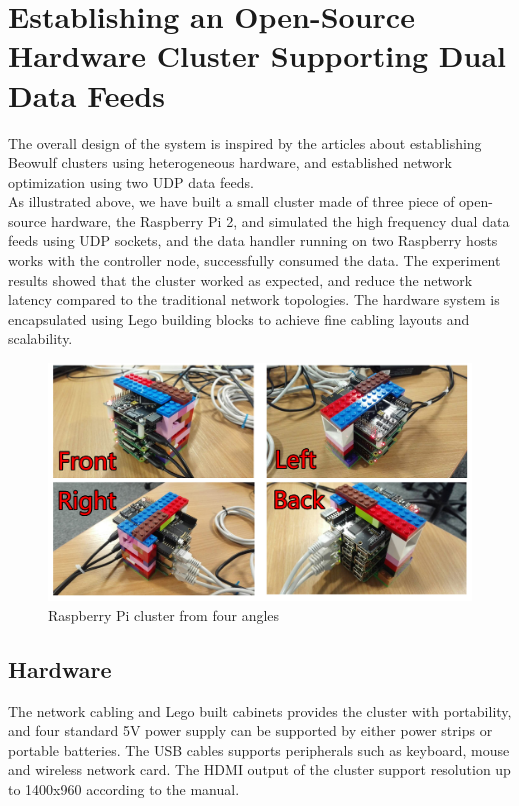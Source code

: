 \documentclass[11pt,openright,a4paper]{report}
\begin{document}
\section{Establishing an Open-Source Hardware Cluster Supporting Dual Data Feeds}
The overall design of the system is inspired by the articles about establishing Beowulf clusters using heterogeneous hardware\cite{kiepert2013creating}, and established network optimization using two UDP data feeds\cite{chordia2013high}. \\
As illustrated above, we have built a small cluster made of three piece of open-source hardware, the Raspberry Pi 2, and simulated the high frequency dual data feeds using UDP sockets, and the data handler running on two Raspberry hosts works with the controller node, successfully consumed the data. The experiment results showed that the cluster worked as expected, and reduce the network latency compared to the traditional network topologies. The hardware system is encapsulated using Lego building blocks to achieve fine cabling layouts and scalability.\\ 
\begin{figure}[H]
	\centering
	\includegraphics[width=0.9\linewidth]{picture/photo/fourScene}
	\caption{Raspberry Pi cluster from four angles}
	\label{fig:fourScene}
\end{figure}
\subsection{Hardware}
The network cabling and Lego built cabinets provides the cluster with portability, and four standard 5V power supply can be supported by either power strips or portable batteries. The USB cables supports peripherals such as keyboard, mouse and wireless network card. The HDMI output of the cluster support resolution up to 1400x960 according to the manual\cite{upton2014raspberry}.\\
\end{document}
